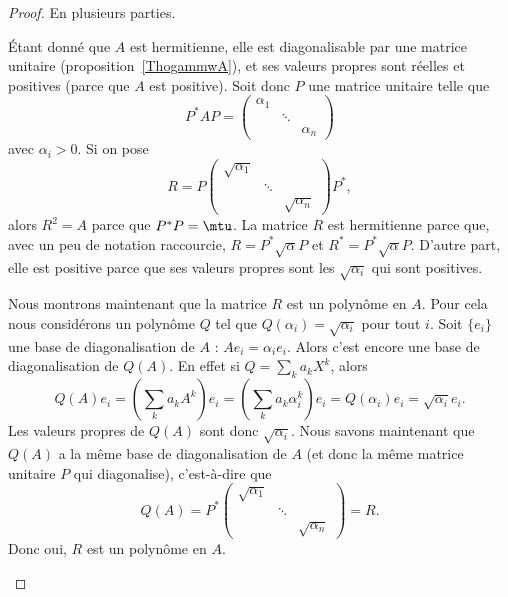 \begin{proof}
	En plusieurs parties.
	\begin{subproof}
		\spitem[Existence]
		Étant donné que \( A \) est hermitienne, elle est diagonalisable par une matrice unitaire (proposition~\ref{ThogammwA}), et ses valeurs propres sont réelles et positives (parce que \( A\) est positive). Soit donc \( P\) une matrice unitaire telle que
		\begin{equation}
			P^*AP=\begin{pmatrix}
				\alpha_1 &        &          \\
				         & \ddots &          \\
				         &        & \alpha_n
			\end{pmatrix}
		\end{equation}
		avec \( \alpha_i>0\). Si on pose
		\begin{equation}
			R=P\begin{pmatrix}
				\sqrt{\alpha_1} &        &                 \\
				                & \ddots &                 \\
				                &        & \sqrt{\alpha_n}
			\end{pmatrix}P^*,
		\end{equation}
		alors \( R^2=A\) parce que \( P^*P=\mtu\).
		La matrice \( R\) est hermitienne parce que, avec un peu de notation raccourcie, \( R=P^*\sqrt{\alpha}P\) et \( R^*=P^*\sqrt{\alpha}P\). D'autre part, elle est positive parce que ses valeurs propres sont les \( \sqrt{\alpha_i}\) qui sont positives.

		\spitem[Polynôme]
		Nous montrons maintenant que la matrice \( R\) est un polynôme en \( A\). Pour cela nous considérons un polynôme \( Q\) tel que \( Q(\alpha_i)=\sqrt{\alpha_i}\) pour tout \( i\). Soit \( \{ e_i \}\) une base de diagonalisation de \( A\) : \( Ae_i=\alpha_ie_i\). Alors c'est encore une base de diagonalisation de \( Q(A)\). En effet si \( Q=\sum_ka_kX^k\), alors
		\begin{equation}
			Q(A)e_i=(\sum_ka_kA^k)e_i=(\sum_ka_k\alpha_i^k)e_i=Q(\alpha_i)e_i=\sqrt{\alpha_i}e_i.
		\end{equation}
		Les valeurs propres de \( Q(A)\) sont donc \( \sqrt{\alpha_i}\). Nous savons maintenant que \( Q(A)\) a la même base de diagonalisation de \( A\) (et donc la même matrice unitaire \( P\) qui diagonalise), c'est-à-dire que
		\begin{equation}
			Q(A)=P^*\begin{pmatrix}
				\sqrt{\alpha_1} &        &                 \\
				                & \ddots &                 \\
				                &        & \sqrt{\alpha_n}
			\end{pmatrix}=R.
		\end{equation}
		Donc oui, \( R\) est un polynôme en \( A\).


\end{subproof}
\end{proof}
